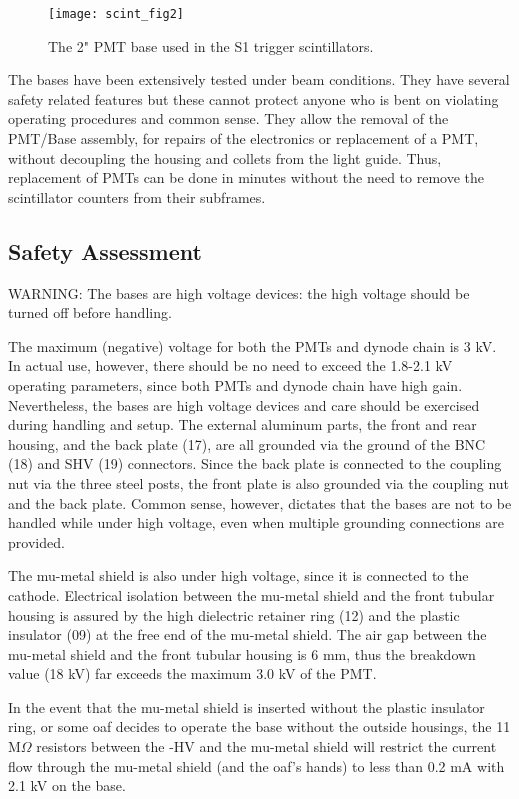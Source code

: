 {  \begin{figure}[tb]
    \begin{center}
      \texttt{[image: scint\_fig2]}
      \caption[Detectors: 2'' PMT Base]{The 2" PMT base used
	in the S1 trigger scintillators.}
      \label{fig:scint_2}
    \end{center}
  \end{figure}
  
  The bases have been extensively tested under beam conditions. 
  They have several safety related features but these cannot protect anyone who 
  is bent on violating operating procedures and common sense. They allow the 
  removal of the PMT/Base assembly, for repairs of the electronics or replacement 
  of a PMT, without decoupling the housing and collets from the light guide. 
  Thus, replacement of PMTs can be done in minutes without the need to remove the 
  scintillator counters from their subframes.
}

\subsection{Safety Assessment}
  
\begin{safetyen}{10}{10}
  WARNING: The bases are high voltage devices: the high voltage should be
  turned off before handling.
  
  The maximum (negative) voltage for both the PMTs and dynode chain is 3 kV. In actual 
  use, however, there should be no need to exceed the 1.8-2.1 kV operating 
  parameters, since both PMTs and dynode chain have high gain. Nevertheless, the 
  bases are high voltage devices and care should be exercised during handling and 
  setup. The external aluminum parts, the front and rear housing, and the back 
  plate (17), are all grounded via the ground of the BNC (18) and SHV (19) 
  connectors. Since the back plate is connected to the coupling nut via the three 
  steel posts, the front plate is also grounded via the coupling nut and the back 
  plate. Common sense, however, dictates that the bases are not to be handled     
  while under high voltage, even when multiple grounding connections are provided.
  
  The mu-metal shield is also under high voltage, since it is connected to the 
  cathode. Electrical isolation between the mu-metal shield and the front 
  tubular housing is assured by the high dielectric retainer ring (12) and the 
  plastic insulator (09) at the free end of the mu-metal shield. The air gap 
  between the mu-metal shield and the front tubular housing is 6 mm, thus the 
  breakdown value (18 kV) far exceeds the maximum 3.0 kV of the PMT.
  
  In the event that the mu-metal shield is inserted without the plastic insulator 
  ring, or some oaf decides to operate the base without the outside housings, the 
  11 M$\Omega$ resistors between the -HV and the mu-metal shield will restrict the 
  current flow through the mu-metal shield (and the oaf's hands) to less than 0.2 
  mA with 2.1 kV on the base. 
\end{safetyen}

